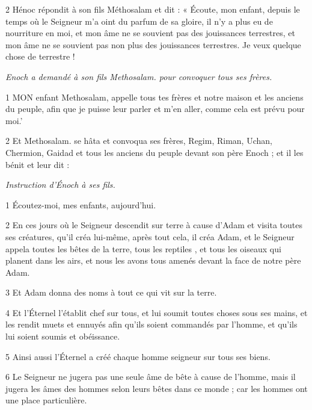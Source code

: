 \par 2 Hénoc répondit à son fils Méthosalam et dit : « Écoute, mon enfant, depuis le temps où le Seigneur m'a oint du parfum de sa gloire, il n'y a plus eu de nourriture en moi, et mon âme ne se souvient pas des jouissances terrestres, et mon âme ne se souvient pas non plus des jouissances terrestres. Je veux quelque chose de terrestre !


\par \textit{Enoch a demandé à son fils Methosalam. pour convoquer tous ses frères.}

\par 1 MON enfant Methosalam, appelle tous tes frères et notre maison et les anciens du peuple, afin que je puisse leur parler et m'en aller, comme cela est prévu pour moi.'

\par 2 Et Methosalam. se hâta et convoqua ses frères, Regim, Riman, Uchan, Chermion, Gaidad et tous les anciens du peuple devant son père Enoch ; et il les bénit et leur dit :


\par \textit{Instruction d'Énoch à ses fils.}

\par 1 Écoutez-moi, mes enfants, aujourd'hui.

\par 2 En ces jours où le Seigneur descendit sur terre à cause d'Adam et visita toutes ses créatures, qu'il créa lui-même, après tout cela, il créa Adam, et le Seigneur appela toutes les bêtes de la terre, tous les reptiles , et tous les oiseaux qui planent dans les airs, et nous les avons tous amenés devant la face de notre père Adam.

\par 3 Et Adam donna des noms à tout ce qui vit sur la terre.

\par 4 Et l'Éternel l'établit chef sur tous, et lui soumit toutes choses sous ses mains, et les rendit muets et ennuyés afin qu'ils soient commandés par l'homme, et qu'ils lui soient soumis et obéissance.

\par 5 Ainsi aussi l'Éternel a créé chaque homme seigneur sur tous ses biens.

\par 6 Le Seigneur ne jugera pas une seule âme de bête à cause de l'homme, mais il jugera les âmes des hommes selon leurs bêtes dans ce monde ; car les hommes ont une place particulière.

